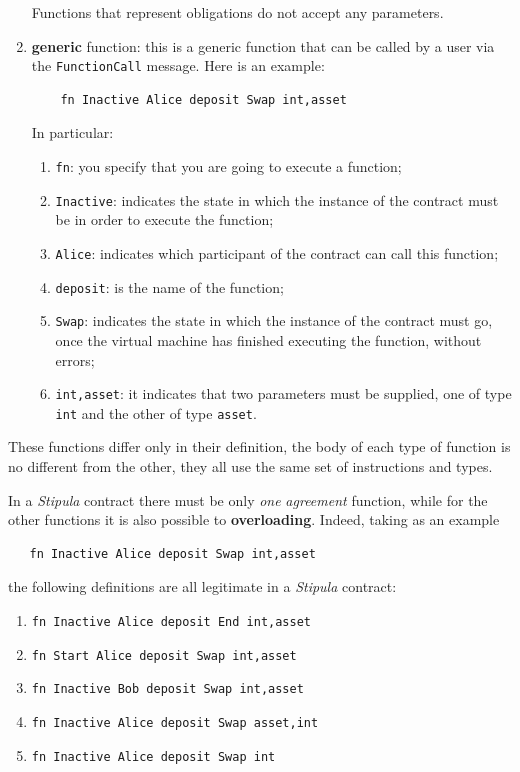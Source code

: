 \begin{enumerate}
  Functions that represent obligations do not accept any parameters.

  \item \textbf{generic} function: this is a generic function that can be called by a user via the 
  \verb|FunctionCall| message. Here is an example:

  \begin{Verbatim}
    fn Inactive Alice deposit Swap int,asset
  \end{Verbatim}

  In particular:
  \begin{enumerate}
    \item \verb|fn|: you specify that you are going to execute a function;
    \item \verb|Inactive|: indicates the state in which the instance of the contract must be in order to 
    execute the function;
    \item \verb|Alice|: indicates which participant of the contract can call this function;
    \item \verb|deposit|: is the name of the function;
    \item \verb|Swap|: indicates the state in which the instance of the contract must go, once the virtual 
    machine has finished executing the function, without errors;
    \item \verb|int,asset|: it indicates that two parameters must be supplied, one of type \verb|int| and 
    the other of type \verb|asset|.
  \end{enumerate}
\end{enumerate}

These functions differ only in their definition, the body of each type of function is no different from 
the other, they all use the same set of instructions and types.

In a \textit{Stipula} contract there must be only \textit{one} \textit{agreement} function, while for the 
other functions it is also possible to \textbf{overloading}. Indeed, taking as an example

\begin{Verbatim}
   fn Inactive Alice deposit Swap int,asset
\end{Verbatim}

the following definitions are all legitimate in a \textit{Stipula} contract:
\begin{enumerate}
  \item \verb|fn Inactive Alice deposit End int,asset|
  \item \verb|fn Start Alice deposit Swap int,asset|
  \item \verb|fn Inactive Bob deposit Swap int,asset|
  \item \verb|fn Inactive Alice deposit Swap asset,int|
  \item \verb|fn Inactive Alice deposit Swap int|
\end{enumerate}

